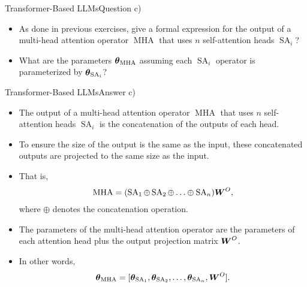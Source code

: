 \documentclass[t]{beamer}
\newcommand\op[1]{\operatorname{#1}}
\begin{document}
\begin{frame}{Transformer-Based LLMs}{Question c)}
    \begin{itemize}
        \item As done in previous exercises, give a formal expression for the
              output of a multi-head attention operator $\op{MHA}$ that uses $n$
              self-attention heads $\op{SA}_i$?
        \item What are the parameters $\vtheta_{\op{MHA}}$ assuming each
              $\op{SA}_i$ operator is parameterized by $\vtheta_{\op{SA}_i}$?
    \end{itemize}
\end{frame}

\begin{frame}{Transformer-Based LLMs}{Answer c)}
    \begin{itemize}
        \item The output of a multi-head attention operator $\op{MHA}$ that uses
              $n$ self-attention heads $\op{SA}_i$ is the concatenation of the
              outputs of each head.
        \item To ensure the size of the output is the same as the input, these
              concatenated outputs are projected to the same size as the input.
        \item That is,
              \begin{align}\label{eq:mha}
                  \op{MHA} = (\op{SA}_1 \oplus \op{SA}_2 \oplus \ldots \oplus \op{SA}_n)\mW^O,
              \end{align}
              where $\oplus$ denotes the concatenation operation.
        \item The parameters of the multi-head attention operator are the
              parameters of each attention head plus the output projection
              matrix ${\boldsymbol{W}}^O$.
        \item In other words,
              \begin{align}
                  \vtheta_{\op{MHA}} = [\vtheta_{\op{SA}_1}, \vtheta_{\op{SA}_2}, \ldots, \vtheta_{\op{SA}_n}, \mW^O].
              \end{align}
    \end{itemize}
\end{frame}
\end{document}

